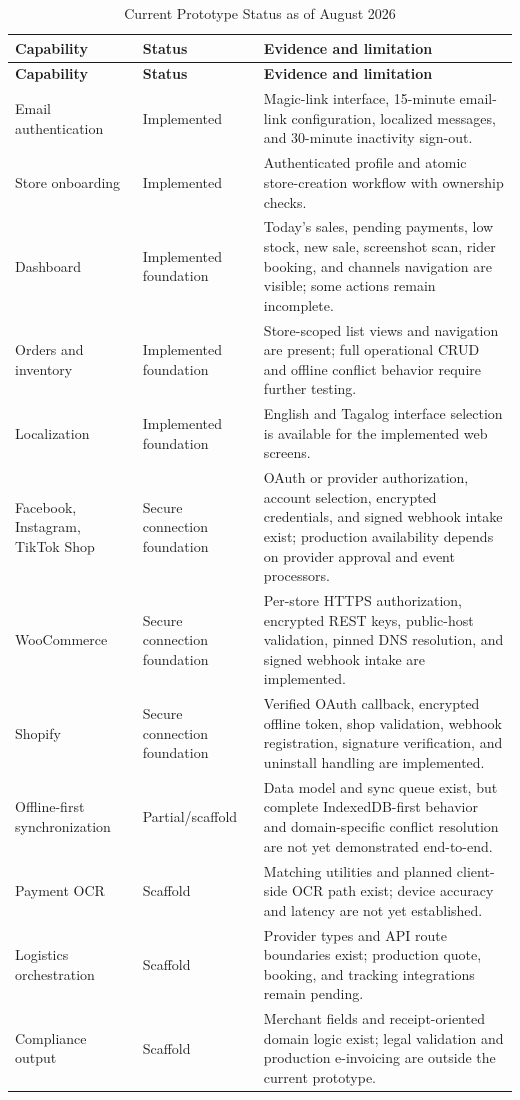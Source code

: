 \documentclass[12pt,oneside]{report}
\begin{document}
\begin{longtable}{L{0.25\textwidth}L{0.20\textwidth}L{0.45\textwidth}}
\caption{Current Prototype Status as of August 2026}\label{tab:status}\\
\toprule
\textbf{Capability} & \textbf{Status} & \textbf{Evidence and limitation} \\
\midrule
\endfirsthead
\toprule
\textbf{Capability} & \textbf{Status} & \textbf{Evidence and limitation} \\
\midrule
\endhead
Email authentication & Implemented & Magic-link interface, 15-minute email-link
configuration, localized messages, and 30-minute inactivity sign-out. \\
Store onboarding & Implemented & Authenticated profile and atomic store-creation
workflow with ownership checks. \\
Dashboard & Implemented foundation & Today's sales, pending payments, low stock,
new sale, screenshot scan, rider booking, and channels navigation are visible;
some actions remain incomplete. \\
Orders and inventory & Implemented foundation & Store-scoped list views and
navigation are present; full operational CRUD and offline conflict behavior
require further testing. \\
Localization & Implemented foundation & English and Tagalog interface selection
is available for the implemented web screens. \\
Facebook, Instagram, TikTok Shop & Secure connection foundation & OAuth or
provider authorization, account selection, encrypted credentials, and signed
webhook intake exist; production availability depends on provider approval and
event processors. \\
WooCommerce & Secure connection foundation & Per-store HTTPS authorization,
encrypted REST keys, public-host validation, pinned DNS resolution, and signed
webhook intake are implemented. \\
Shopify & Secure connection foundation & Verified OAuth callback, encrypted
offline token, shop validation, webhook registration, signature verification,
and uninstall handling are implemented. \\
Offline-first synchronization & Partial/scaffold & Data model and sync queue
exist, but complete IndexedDB-first behavior and domain-specific conflict
resolution are not yet demonstrated end-to-end. \\
Payment OCR & Scaffold & Matching utilities and planned client-side OCR path
exist; device accuracy and latency are not yet established. \\
Logistics orchestration & Scaffold & Provider types and API route boundaries
exist; production quote, booking, and tracking integrations remain pending. \\
Compliance output & Scaffold & Merchant fields and receipt-oriented domain
logic exist; legal validation and production e-invoicing are outside the current
prototype. \\
\bottomrule
\end{longtable}
\end{document}
